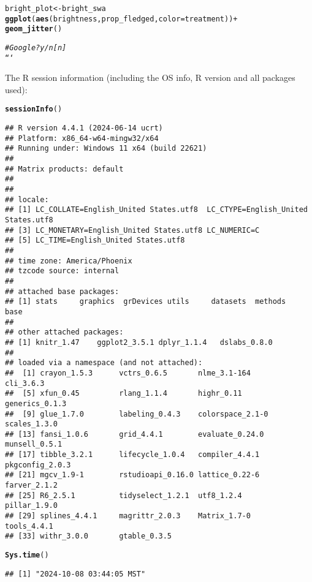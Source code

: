 \documentclass{article}\usepackage[]{graphicx}\usepackage[]{xcolor}
\makeatletter
\newcommand{\hlcom}[1]{\textcolor[rgb]{0.678,0.584,0.686}{\textit{#1}}}%
\newcommand{\hldef}[1]{\textcolor[rgb]{0.345,0.345,0.345}{#1}}%
\newcommand{\hlkwd}[1]{\textcolor[rgb]{0.737,0.353,0.396}{\textbf{#1}}}%
\newenvironment{kframe}{%
 \def\at@end@of@kframe{}%
 \ifinner\ifhmode%
  \def\at@end@of@kframe{\end{minipage}}%
  \begin{minipage}{\columnwidth}%
 \fi\fi%
 \def\FrameCommand##1{\hskip\@totalleftmargin \hskip-\fboxsep
 \colorbox{shadecolor}{##1}\hskip-\fboxsep
     \hskip-\linewidth \hskip-\@totalleftmargin \hskip\columnwidth}%
 \MakeFramed {\advance\hsize-\width
   \@totalleftmargin\z@ \linewidth\hsize
   \@setminipage}}%
 {\par\unskip\endMakeFramed%
 \at@end@of@kframe}
\newenvironment{knitrout}{}{} %
\makeatother
\begin{document}
\begin{knitrout}
\begin{kframe}
\begin{alltt}
bright_plot <- bright_swa %>%
  \hlkwd{ggplot}(\hlkwd{aes}(brightness, prop_fledged, color = treatment)) +
  \hlkwd{geom_jitter}()

\hlcom{# Google? y/n [n]}
```
\end{alltt}


{\ttfamily\noindent\bfseries{}}\end{kframe}
\end{knitrout}

The R session information (including the OS info, R version and all
packages used):

\begin{knitrout}
\color{fgcolor}\begin{kframe}
\begin{alltt}
\hlkwd{sessionInfo}\hldef{()}
\end{alltt}
\begin{verbatim}
## R version 4.4.1 (2024-06-14 ucrt)
## Platform: x86_64-w64-mingw32/x64
## Running under: Windows 11 x64 (build 22621)
## 
## Matrix products: default
## 
## 
## locale:
## [1] LC_COLLATE=English_United States.utf8  LC_CTYPE=English_United States.utf8   
## [3] LC_MONETARY=English_United States.utf8 LC_NUMERIC=C                          
## [5] LC_TIME=English_United States.utf8    
## 
## time zone: America/Phoenix
## tzcode source: internal
## 
## attached base packages:
## [1] stats     graphics  grDevices utils     datasets  methods   base     
## 
## other attached packages:
## [1] knitr_1.47    ggplot2_3.5.1 dplyr_1.1.4   dslabs_0.8.0 
## 
## loaded via a namespace (and not attached):
##  [1] crayon_1.5.3      vctrs_0.6.5       nlme_3.1-164      cli_3.6.3        
##  [5] xfun_0.45         rlang_1.1.4       highr_0.11        generics_0.1.3   
##  [9] glue_1.7.0        labeling_0.4.3    colorspace_2.1-0  scales_1.3.0     
## [13] fansi_1.0.6       grid_4.4.1        evaluate_0.24.0   munsell_0.5.1    
## [17] tibble_3.2.1      lifecycle_1.0.4   compiler_4.4.1    pkgconfig_2.0.3  
## [21] mgcv_1.9-1        rstudioapi_0.16.0 lattice_0.22-6    farver_2.1.2     
## [25] R6_2.5.1          tidyselect_1.2.1  utf8_1.2.4        pillar_1.9.0     
## [29] splines_4.4.1     magrittr_2.0.3    Matrix_1.7-0      tools_4.4.1      
## [33] withr_3.0.0       gtable_0.3.5
\end{verbatim}
\begin{alltt}
\hlkwd{Sys.time}\hldef{()}
\end{alltt}
\begin{verbatim}
## [1] "2024-10-08 03:44:05 MST"
\end{verbatim}
\end{kframe}
\end{knitrout}
\end{document}
